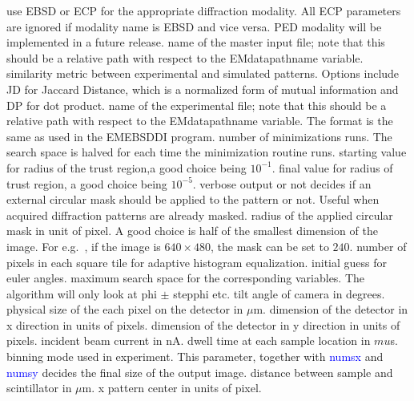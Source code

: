 \documentclass[DIV=calc, paper=letter, fontsize=11pt]{scrartcl}	 %
\begin{document}
\begin{itemize}
	 use \textsf{EBSD} or \textsf{ECP} for the appropriate diffraction modality. All ECP parameters are ignored if modality name is EBSD and vice versa. \textsf{PED} modality will be implemented in a future release.
	 name of the master input file; note that this should be a relative path with respect to the \textsf{EMdatapathname} variable.
	 similarity metric between experimental and simulated patterns. Options include \textsf{JD} for Jaccard Distance, which is a normalized form of mutual information and \textsf{DP} for dot product.
	 name of the experimental file; note that this should be a relative path with respect to the \textsf{EMdatapathname} variable. The format is the same as used in the \textsf{EMEBSDDI} program.
	 number of minimizations runs. The search space is halved for each time the minimization routine runs.
	 starting value for radius of the trust region,a good choice being $10^{-1}$.
	 final value for radius of trust region, a good choice being $10^{-5}$.
	 verbose output or not
	 decides if an external circular mask should be applied to the pattern or not. Useful when acquired diffraction patterns are already masked.
	 radius of the applied circular mask in unit of pixel. A good choice is half of the smallest dimension of the image. For e.g.~, if the image is $640\times480$, the mask can be set to $240$. 
	 number of pixels in each square tile for adaptive histogram equalization. 
	 initial guess for euler angles.
	 maximum search space for the corresponding variables. The algorithm will only look at \textsf{phi} $\pm$ \textsf{step\textunderscore phi} etc.
	tilt angle of camera in degrees.
	physical size of the each pixel on the detector in $\mu$m.
	 dimension of the detector in x direction in units of pixels.
	 dimension of the detector in y direction in units of pixels.
	 incident beam current in nA.
	 dwell time at each sample location in $mu$s.
	 binning mode used in experiment. This parameter, together with \textcolor{blue}{\textsf{numsx}} and \textcolor{blue}{\textsf{numsy}} decides the final size of the output image.
	 distance between sample and scintillator in $\mu$m.
	 x pattern center in units of pixel.

\end{itemize}
\end{document}
